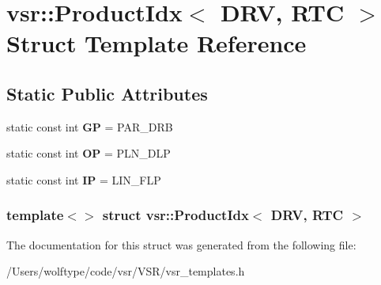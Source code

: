 \hypertarget{structvsr_1_1_product_idx_3_01_d_r_v_00_01_r_t_c_01_4}{\section{vsr\-:\-:Product\-Idx$<$ D\-R\-V, R\-T\-C $>$ Struct Template Reference}
\label{structvsr_1_1_product_idx_3_01_d_r_v_00_01_r_t_c_01_4}
}
\subsection*{Static Public Attributes}
\begin{DoxyCompactItemize}
\item 
\hypertarget{structvsr_1_1_product_idx_3_01_d_r_v_00_01_r_t_c_01_4_a71be9e84557d5fb5f4685ed311b89249}{static const int {\bfseries G\-P} = P\-A\-R\-\_\-\-D\-R\-B}\label{structvsr_1_1_product_idx_3_01_d_r_v_00_01_r_t_c_01_4_a71be9e84557d5fb5f4685ed311b89249}

\item 
\hypertarget{structvsr_1_1_product_idx_3_01_d_r_v_00_01_r_t_c_01_4_aedc4e4a7b43a5a81f6feff0b21500f6a}{static const int {\bfseries O\-P} = P\-L\-N\-\_\-\-D\-L\-P}\label{structvsr_1_1_product_idx_3_01_d_r_v_00_01_r_t_c_01_4_aedc4e4a7b43a5a81f6feff0b21500f6a}

\item 
\hypertarget{structvsr_1_1_product_idx_3_01_d_r_v_00_01_r_t_c_01_4_a6ddbfb183de6ba8c1f4302f4e8844dce}{static const int {\bfseries I\-P} = L\-I\-N\-\_\-\-F\-L\-P}\label{structvsr_1_1_product_idx_3_01_d_r_v_00_01_r_t_c_01_4_a6ddbfb183de6ba8c1f4302f4e8844dce}

\end{DoxyCompactItemize}
\subsubsection*{template$<$$>$ struct vsr\-::\-Product\-Idx$<$ D\-R\-V, R\-T\-C $>$}



The documentation for this struct was generated from the following file\-:\begin{DoxyCompactItemize}
\item 
/\-Users/wolftype/code/vsr/\-V\-S\-R/vsr\-\_\-templates.\-h\end{DoxyCompactItemize}
